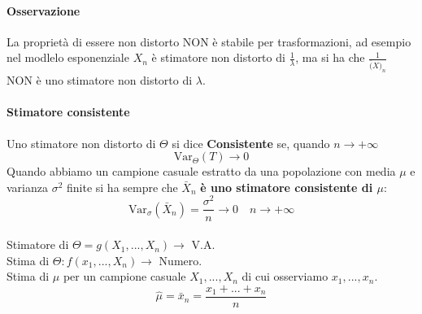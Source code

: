 \documentclass[12pt, a4paper, openany]{book}
\begin{document}
\paragraph*{Osservazione} La proprietà di essere non distorto NON è stabile per
trasformazioni, ad esempio nel modlelo esponenziale $X_n$ è stimatore non distorto
di $\frac{1}{\lambda}$, ma si ha che $\frac{1}{\bar(X)_n}$ NON è uno stimatore non
distorto di $\lambda$.
\paragraph*{Stimatore consistente} Uno stimatore non distorto di $\Theta$ si dice
\textbf{Consistente} se, quando $n \rightarrow + \infty$
\begin{equation*}
    \text{Var}_\Theta (T) \rightarrow 0
\end{equation*}
Quando abbiamo un campione casuale estratto da una popolazione con media $\mu$
e varianza $\sigma^2$ finite si ha sempre che $\bar{X}_n$ \textbf{è uno stimatore consistente
di $\mu$}:
\begin{equation*}
    \text{Var}_\sigma(\bar{X}_n) = \frac{\sigma^2}{n} \rightarrow 0 \quad n \rightarrow + \infty
\end{equation*}
\\ Stimatore di $\Theta = g(X_1, ..., X_n) \rightarrow$ V.A.
\\ Stima di $\Theta: f(x_1, ..., X_n) \rightarrow$ Numero.
\\ Stima di $\mu$ per un campione casuale $X_1, ..., X_n$ di cui osserviamo
$x_1, ..., x_n$.
\begin{equation*}
    \hat{\mu} = \bar{x}_n = \frac{x_1+...+x_n}{n}
\end{equation*}
\end{document}
